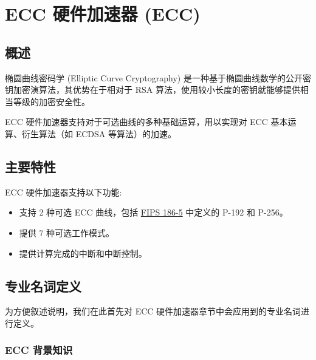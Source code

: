 \documentclass[main\_\_CN.tex]{subfiles}
\begin{document}

\ifglobal
\else
    {\let\clearpage\relax \listoftodos}
    {\let\clearpage\relax \listofdonetodos}
    \tableofcontents
\fi



\hypertarget{ecc}{}
\chapter{ECC 硬件加速器 (ECC)}
\label{mod:ecc}

\section{概述}
椭圆曲线密码学 (Elliptic Curve Cryptography) 是一种基于椭圆曲线数学的公开密钥加密演算法，其优势在于相对于 RSA 算法，使用较小长度的密钥就能够提供相当等级的加密安全性。

\chipname{} ECC 硬件加速器支持对于可选曲线的多种基础运算，用以实现对 ECC 基本运算、衍生算法（如 ECDSA 等算法）的加速。

\section{主要特性}
\chipname{} ECC 硬件加速器支持以下功能:

\begin{itemize}
    \item 支持 2 种可选 ECC 曲线，包括 \href{https://nvlpubs.nist.gov/nistpubs/FIPS/NIST.FIPS.186-5.pdf}{FIPS 186-5} 中定义的 P-192 和 P-256。
    \item 提供 7 种可选工作模式。
    \item 提供计算完成的中断和中断控制。
\end{itemize}

\section{专业名词定义}
为方便叙述说明，我们在此首先对 ECC 硬件加速器章节中会应用到的专业名词进行定义。

\subsection{ECC 背景知识}
\end{document}
